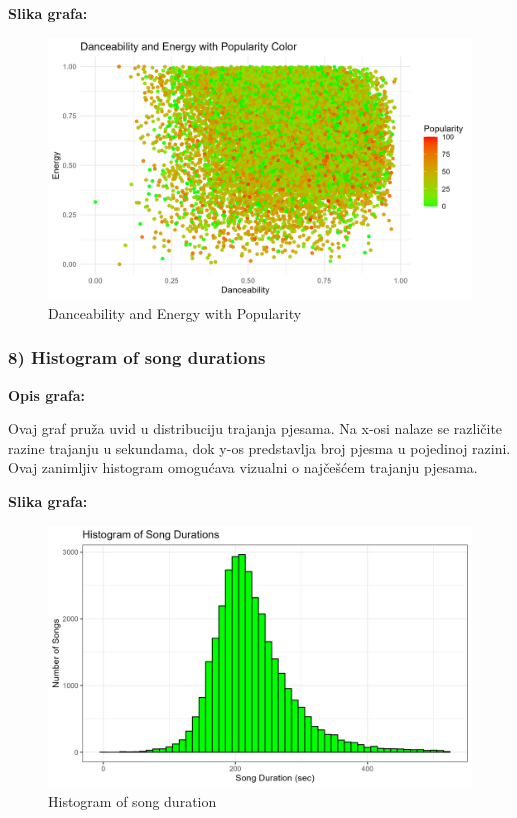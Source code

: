 	\textbf{Slika grafa:}
	\begin{figure}[H]
		\includegraphics[scale=0.9]{slike/Dance-Energy-popularity.png}
		\centering
		\caption{ Danceability and Energy with Popularity}
		
	\end{figure}


	\subsubsection{8) Histogram of song durations}
    
    \textbf{Opis grafa:}
    
Ovaj graf pruža uvid u distribuciju trajanja pjesama. Na x-osi nalaze se različite razine trajanju u sekundama, dok y-os predstavlja broj pjesma u pojedinoj razini. Ovaj zanimljiv histogram omogućava vizualni o najčešćem trajanju pjesama.
    

    \textbf{Slika grafa:}
    \begin{figure}[H]
        \includegraphics[scale=0.9]{slike/Histogram of song durations.png}
        \centering
        \caption{Histogram of song duration}
        
    \end{figure}


\eject



